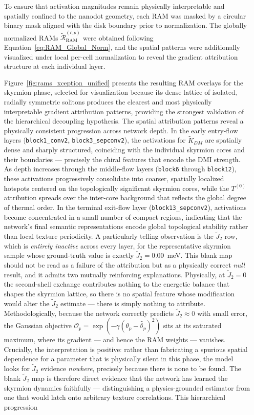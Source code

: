 \documentclass[letterpaper, 12, one column]{article}
\begin{document}
To ensure that activation magnitudes remain physically
interpretable and spatially confined to the nanodot
geometry, each RAM was masked by a circular binary mask
aligned with the disk boundary prior to normalization.
The globally normalized RAMs
$\tilde{\mathcal{R}}_{\text{RAM}}^{(l,p)}$ were obtained
following Equation~\ref{eq:RAM_Global_Norm}, and the
spatial patterns were additionally visualized under local
per-cell normalization to reveal the gradient attribution
structure at each individual layer.

Figure~\ref{fig:rams_xception_unified} presents the
resulting RAM overlays for the skyrmion phase, selected for
visualization because its dense lattice of isolated,
radially symmetric solitons produces the clearest and most
physically interpretable gradient attribution patterns,
providing the strongest validation of the hierarchical
decoupling hypothesis. The spatial attribution patterns
reveal a physically consistent progression across network
depth. In the early entry-flow layers
(\texttt{block1\_conv2}, \texttt{block3\_sepconv2}), the
activations for $\tilde{K}_{DM}$ are spatially dense and
sharply structured, coinciding with the individual skyrmion
cores and their boundaries --- precisely the chiral features
that encode the DMI strength. As depth increases through the
middle-flow layers (\texttt{block6} through
\texttt{block12}), these activations progressively
consolidate into coarser, spatially localized hotspots
centered on the topologically significant skyrmion cores,
while the $T^{(0)}$ attribution spreads over the inter-core
background that reflects the global degree of thermal order.
In the terminal exit-flow layer (\texttt{block13\_sepconv2}),
activations become concentrated in a small number of compact
regions, indicating that the network's final semantic
representations encode global topological stability rather
than local texture periodicity. {\color[rgb]{0,0,1}A particularly telling
observation is the $\tilde{J}_2$ row, which is \emph{entirely
inactive} across every layer, for the representative skyrmion
sample whose ground-truth value is exactly
$\tilde{J}_2 = 0.00$~meV. This blank map should not be read as
a failure of the attribution but as a physically correct
\emph{null} result, and it admits two mutually reinforcing
explanations. Physically, at $\tilde{J}_2 = 0$ the second-shell
exchange contributes nothing to the energetic balance that
shapes the skyrmion lattice, so there is no spatial feature
whose modification would alter the $\tilde{J}_2$ estimate ---
there is simply nothing to attribute. Methodologically, because
the network correctly predicts $\tilde{J}_2 \approx 0$ with
small error, the Gaussian objective
$\mathcal{O}_p = \exp(-\gamma(\theta_p-\hat{\theta}_p)^2)$ sits
at its saturated maximum, where its gradient --- and hence the
RAM weights --- vanishes. Crucially, the interpretation is
positive: rather than fabricating a spurious spatial dependence
for a parameter that is physically silent in this phase, the
model looks for $\tilde{J}_2$ evidence \emph{nowhere}, precisely
because there is none to be found. The blank $\tilde{J}_2$ map is
therefore direct evidence that the network has learned the
skyrmion dynamics faithfully --- distinguishing a
physics-grounded estimator from one that would latch onto
arbitrary texture correlations.} This hierarchical progression
\end{document}
